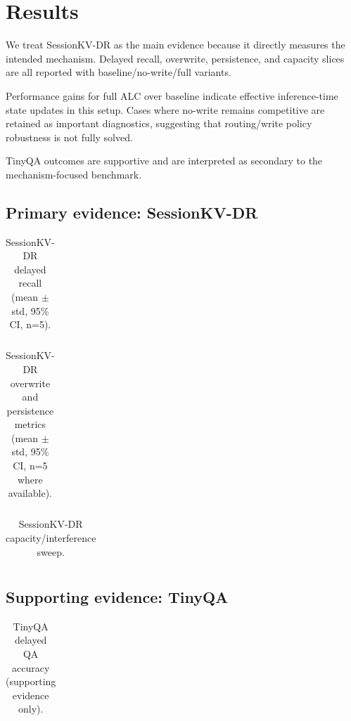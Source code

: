\section{Results}
We treat SessionKV-DR as the main evidence because it directly measures the intended mechanism. Delayed recall, overwrite, persistence, and capacity slices are all reported with baseline/no-write/full variants.

Performance gains for full ALC over baseline indicate effective inference-time state updates in this setup. Cases where no-write remains competitive are retained as important diagnostics, suggesting that routing/write policy robustness is not fully solved.

TinyQA outcomes are supportive and are interpreted as secondary to the mechanism-focused benchmark.

\subsection{Primary evidence: SessionKV-DR}
\begin{table}[h]
\centering
\begin{tabular}{llll}
\toprule

\bottomrule
\end{tabular}
\caption{SessionKV-DR delayed recall (mean $\pm$ std, 95\% CI, n=5).}
\end{table}

\begin{table}[h]
\centering
\begin{tabular}{llll}
\toprule

\bottomrule
\end{tabular}
\caption{SessionKV-DR overwrite and persistence metrics (mean $\pm$ std, 95\% CI, n=5 where available).}
\end{table}

\begin{table}[h]
\centering
\begin{tabular}{llll}
\toprule

\bottomrule
\end{tabular}
\caption{SessionKV-DR capacity/interference sweep.}
\end{table}

\subsection{Supporting evidence: TinyQA}
\begin{table}[h]
\centering
\begin{tabular}{llll}
\toprule

\bottomrule
\end{tabular}
\caption{TinyQA delayed QA accuracy (supporting evidence only).}
\end{table}

